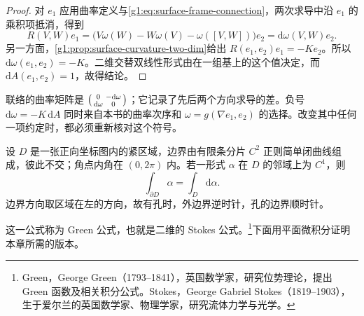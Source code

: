 \begin{proof}
	对 \(e_1\) 应用曲率定义与\eqref{g1:eq:surface-frame-connection}，两次求导中沿 \(e_1\) 的乘积项抵消，得到
	\[
		R(V,W)e_1=\bigl(V\omega(W)-W\omega(V)-\omega([V,W])\bigr)e_2
		=\mathrm{d}\omega(V,W)e_2.
	\]
	另一方面，\cref{g1:prop:surface-curvature-two-dim}给出 \(R(e_1,e_2)e_1=-Ke_2\)。所以 \(\mathrm{d}\omega(e_1,e_2)=-K\)。二维交替双线性形式由在一组基上的这个值决定，而 \(\mathrm{d}A(e_1,e_2)=1\)，故得结论。
\end{proof}

联络的曲率矩阵是 \(\begin{psmallmatrix}0&-\mathrm{d}\omega\\\mathrm{d}\omega&0\end{psmallmatrix}\)；它记录了先后两个方向求导的差。负号 \(\mathrm{d}\omega=-K\,\mathrm{d}A\) 同时来自本书的曲率次序和 \(\omega=g(\nabla e_1,e_2)\) 的选择。改变其中任何一项约定时，都必须重新核对这个符号。

\begin{lemma}[Green 公式]
	\label{g1:lem:green-formula}
	设 \(D\) 是一张正向坐标图内的紧区域，边界由有限条分片 \(C^2\) 正则简单闭曲线组成，彼此不交；角点内角在 \((0,2\pi)\) 内。若一形式 \(\alpha\) 在 \(D\) 的邻域上为 \(C^1\)，则
	\[
		\int_{\partial D}\alpha=\int_D\mathrm{d}\alpha.
	\]
	边界方向取区域在左的方向，故有孔时，外边界逆时针，孔的边界顺时针。
\end{lemma}

这一公式称为 Green 公式，也就是二维的 Stokes 公式。\footnote{Green，George Green（1793--1841），英国数学家，研究位势理论，提出 Green 函数及相关积分公式。Stokes，George Gabriel Stokes（1819--1903），生于爱尔兰的英国数学家、物理学家，研究流体力学与光学。}下面用平面微积分证明本章所需的版本。

